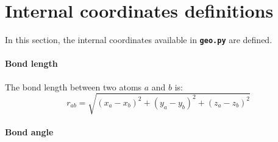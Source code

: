 \documentclass[a4paper,11pt,DIV=15,openany,twoside=false]{scrbook}
\newcommand{\sharc}{\textsc{Sharc}}
\newcommand{\ttt}[1]{\textbf{\texttt{#1}}}
\newcommand{\VEC}[1]{\ensuremath{\mathbf{#1}}}
\begin{document}
% 
% 
% 
% 


\section{Internal coordinates definitions}\label{met:geo}

In this section, the internal coordinates available in \ttt{geo.py} are defined.

\paragraph{Bond length}

The bond length between two atoms $a$ and $b$ is:
\begin{equation}
  r_{ab}=
  \sqrt{
    (x_a-x_b)^2+(y_a-y_b)^2+(z_a-z_b)^2
  }
\end{equation}

\paragraph{Bond angle}
\end{document}
